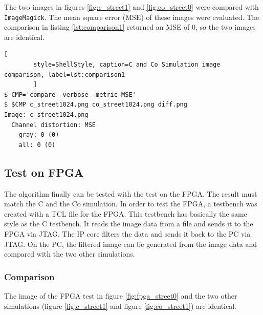 The two images in figures \ref{fig:c_street1} and \ref{fig:co_street0} were compared with \texttt{ImageMagick}. The mean square error (MSE) of these images were evaluated. The comparison in listing \ref{lst:comparison1} returned an MSE of 0, so the two images are identical.

\begin{minipage}{\linewidth}
\vspace{1ex}
    \begin{lstlisting}[
        style=ShellStyle, caption=C and Co Simulation image comparison, label=lst:comparison1
        ]
$ CMP='compare -verbose -metric MSE'
$ $CMP c_street1024.png co_street1024.png diff.png
Image: c_street1024.png
  Channel distortion: MSE
    gray: 0 (0)
    all: 0 (0)
\end{lstlisting}
\end{minipage}
\vspace{1ex}


%
%

\subsection{Test on FPGA} \label{sec:impl}

The algorithm finally can be tested with the test on the FPGA. The result must match the C and the Co simulation.
In order to test the FPGA, a testbench was created with a TCL file for the FPGA. This testbench has basically the same style as the C testbench. It reads the image data from a file and sends it to the FPGA via JTAG. The IP core filters the data and sends it back to the PC via JTAG. On the PC, the filtered image can be generated from the image data and compared with the two other simulations.


\subsubsection*{Comparison}
The image of the FPGA test in figure  \ref{fig:fpga_street0} and the two other simulations (figure \ref{fig:c_street1} and figure \ref{fig:co_street1}) are identical. \\

